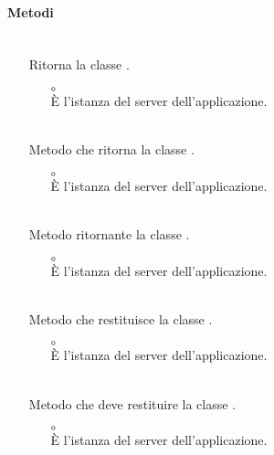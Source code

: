 \paragraph*{Metodi}
\begin{itemize}
\item[]  \\ Ritorna la classe .
\begin{itemize}\addtolength{\itemsep}{-0.5\baselineskip}
\item[$\circ$]  \\ È l'istanza del server dell'applicazione.
\end{itemize}
\item[]  \\ Metodo che ritorna la classe .
\begin{itemize}\addtolength{\itemsep}{-0.5\baselineskip}
\item[$\circ$]  \\ È l'istanza del server dell'applicazione.
\end{itemize}
\item[]  \\ Metodo ritornante la classe .
\begin{itemize}\addtolength{\itemsep}{-0.5\baselineskip}
\item[$\circ$]  \\ È l'istanza del server dell'applicazione.
\end{itemize}
\item[]  \\ Metodo che restituisce la classe .
\begin{itemize}\addtolength{\itemsep}{-0.5\baselineskip}
\item[$\circ$]  \\ È l'istanza del server dell'applicazione.
\end{itemize}
\item[]  \\ Metodo che deve restituire la classe .
\begin{itemize}\addtolength{\itemsep}{-0.5\baselineskip}
\item[$\circ$]  \\ È l'istanza del server dell'applicazione.

\end{itemize}
\end{itemize}
